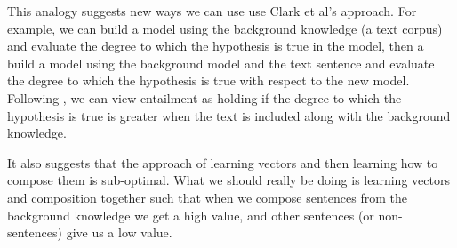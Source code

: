 \documentclass{article}
\begin{document}
This analogy suggests new ways we can use use Clark et al's
approach. For example, we can build a model using the background
knowledge (a text corpus) and evaluate the degree to which the
hypothesis is true in the model, then a build a model using the
background model and the text sentence and evaluate the degree to
which the hypothesis is true with respect to the new model. Following
\cite{Glickman:05}, we can view entailment as holding if the degree to
which the hypothesis is true is greater when the text is included
along with the background knowledge.

It also suggests that the approach of learning vectors and then
learning how to compose them is sub-optimal. What we should really be
doing is learning vectors and composition together such that when we
compose sentences from the background knowledge we get a high value,
and other sentences (or non-sentences) give us a low value.







\end{document}
